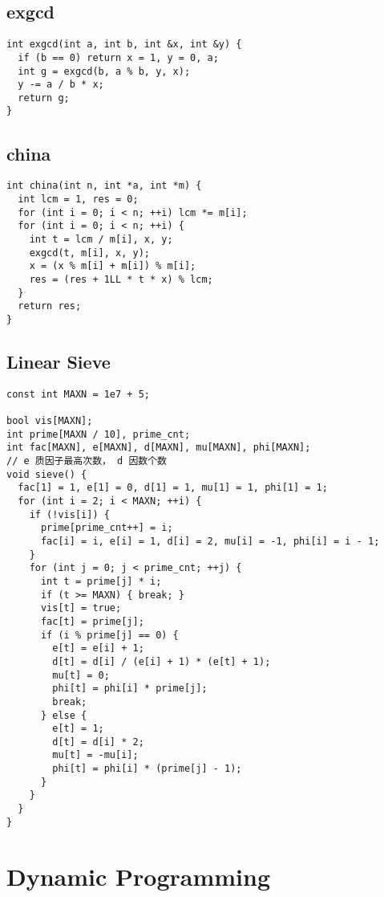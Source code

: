 \documentclass[twoside]{article}
\begin{document}
\subsection{exgcd}
\begin{lstlisting}
int exgcd(int a, int b, int &x, int &y) {
  if (b == 0) return x = 1, y = 0, a;
  int g = exgcd(b, a % b, y, x);
  y -= a / b * x;
  return g;
}

\end{lstlisting}
\subsection{china}
\begin{lstlisting}
int china(int n, int *a, int *m) {
  int lcm = 1, res = 0;
  for (int i = 0; i < n; ++i) lcm *= m[i];
  for (int i = 0; i < n; ++i) {
    int t = lcm / m[i], x, y;
    exgcd(t, m[i], x, y);
    x = (x % m[i] + m[i]) % m[i];
    res = (res + 1LL * t * x) % lcm;
  }
  return res;
}

\end{lstlisting}
\subsection{Linear Sieve}
\begin{lstlisting}
const int MAXN = 1e7 + 5;

bool vis[MAXN];
int prime[MAXN / 10], prime_cnt;
int fac[MAXN], e[MAXN], d[MAXN], mu[MAXN], phi[MAXN];
// e 质因子最高次数， d 因数个数
void sieve() {
  fac[1] = 1, e[1] = 0, d[1] = 1, mu[1] = 1, phi[1] = 1;
  for (int i = 2; i < MAXN; ++i) {
    if (!vis[i]) {
      prime[prime_cnt++] = i;
      fac[i] = i, e[i] = 1, d[i] = 2, mu[i] = -1, phi[i] = i - 1;
    }
    for (int j = 0; j < prime_cnt; ++j) {
      int t = prime[j] * i;
      if (t >= MAXN) { break; }
      vis[t] = true;
      fac[t] = prime[j];
      if (i % prime[j] == 0) {
        e[t] = e[i] + 1;
        d[t] = d[i] / (e[i] + 1) * (e[t] + 1);
        mu[t] = 0;
        phi[t] = phi[i] * prime[j];
        break;
      } else {
        e[t] = 1;
        d[t] = d[i] * 2;
        mu[t] = -mu[i];
        phi[t] = phi[i] * (prime[j] - 1);
      }
    }
  }
}

\end{lstlisting}

\section{Dynamic Programming}
\end{document}

